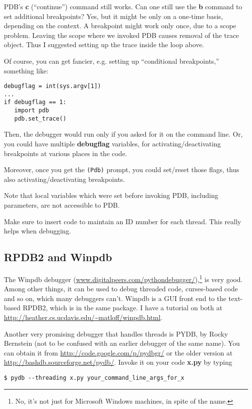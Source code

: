 PDB's {\bf c} (``continue'') command still works.  Can one still use the
{\bf b} command to set additional breakpoints?  Yes, but it might be
only on a one-time basis, depending on the context.  A breakpoint might
work only once, due to a scope problem.  Leaving the scope where we
invoked PDB causes removal of the trace object.  Thus I suggested
setting up the trace inside the loop above.

Of course, you can get fancier, e.g. setting up ``conditional
breakpoints,'' something like:

\begin{Verbatim}[fontsize=\relsize{-2}]
debugflag = int(sys.argv[1])
...
if debugflag == 1:
   import pdb
   pdb.set_trace()
\end{Verbatim}

Then, the debugger would run only if you asked for it on the command
line.  Or, you could have multiple {\bf debugflag} variables, for
activating/deactivating breakpoints at various places in the code.

Moreover, once you get the {\tt (Pdb)} prompt, you could set/reset
those flags, thus also activating/deactivating breakpoints.

Note that local variables which were set before invoking PDB, including
parameters, are not accessible to PDB.  

Make sure to insert code to maintain an ID number for each thread.  This
really helps when debugging.

\subsection{RPDB2 and Winpdb}

The Winpdb debugger
(\url{www.digitalpeers.com/pythondebugger/}),\footnote{No, it's not just
for Microsoft Windows machines, in spite of the name.} is very good.
Among other things, it can be used to debug threaded code, curses-based
code and so on, which many debuggers can't.  Winpdb is a GUI front end
to the text-based RPDB2, which is in the same package.  I have a
tutorial on both at
\url{http://heather.cs.ucdavis.edu/~matloff/winpdb.html}.

Another very promising debugger that handles threads is PYDB, by Rocky
Bernstein (not to be confused with an earlier debugger of the same
name).  You can obtain it from \url{http://code.google.com/p/pydbgr/} or
the older version at \url{http://bashdb.sourceforge.net/pydb/}.
Invoke it on your code {\bf x.py} by typing

\begin{Verbatim}[fontsize=\relsize{-2}]
$ pydb --threading x.py your_command_line_args_for_x
\end{Verbatim}

